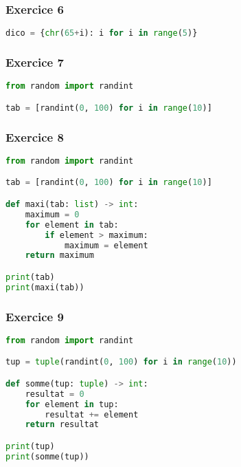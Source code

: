 \documentclass[svgnames,11pt]{beamer}
\begin{document}
\begin{frame}[fragile]
    \frametitle{Exercice 6}

\begin{exo}
\begin{lstlisting}[language=Python ,basicstyle=\ttfamily\small , xleftmargin=2em, xrightmargin=2em]
dico = {chr(65+i): i for i in range(5)}
\end{lstlisting}
\end{exo}
\end{frame}

\begin{frame}[fragile]
    \frametitle{Exercice 7}

\begin{exo}
\begin{lstlisting}[language=Python,basicstyle=\ttfamily\small  , xleftmargin=2em, xrightmargin=2em]
from random import randint

tab = [randint(0, 100) for i in range(10)]
\end{lstlisting}
\end{exo}
\end{frame}

\begin{frame}[fragile]
    \frametitle{Exercice 8}

\begin{exo}
\begin{lstlisting}[language=Python,basicstyle=\ttfamily\small  , xleftmargin=2em, xrightmargin=2em]
from random import randint

tab = [randint(0, 100) for i in range(10)]

def maxi(tab: list) -> int:
    maximum = 0
    for element in tab:
        if element > maximum:
            maximum = element
    return maximum

print(tab)
print(maxi(tab))
\end{lstlisting}
\end{exo}
\end{frame}

\begin{frame}[fragile]
    \frametitle{Exercice 9}

\begin{exo}
\begin{lstlisting}[language=Python,basicstyle=\ttfamily\small  , xleftmargin=2em, xrightmargin=2em]
from random import randint

tup = tuple(randint(0, 100) for i in range(10))

def somme(tup: tuple) -> int:
    resultat = 0
    for element in tup:
        resultat += element
    return resultat

print(tup)
print(somme(tup))
\end{lstlisting}
\end{exo}
\end{frame}
\end{document}
